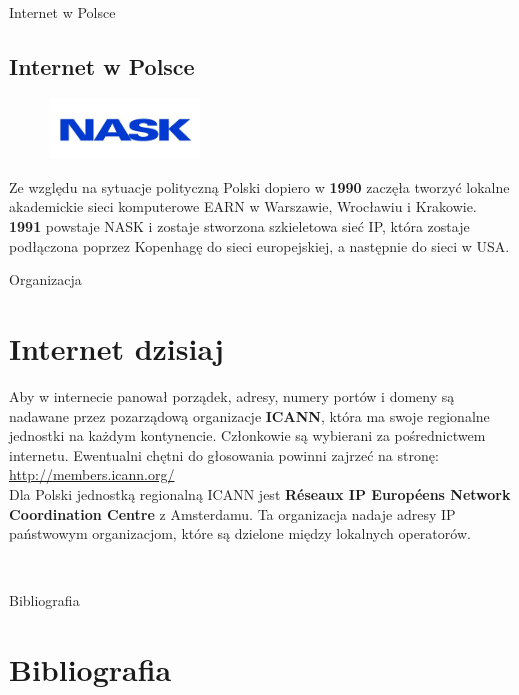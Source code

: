 \documentclass{beamer}
\begin{document}
	\begin{frame}{Internet w Polsce}
		\subsection{Internet w Polsce}
		\begin{figure}
			\flushleft
			\vspace{40pt}
			\includegraphics[width=4cm]{NASK.png}
		\end{figure}
		Ze względu na sytuacje polityczną Polski dopiero w \textbf{1990} zaczęła tworzyć lokalne akademickie sieci komputerowe EARN w Warszawie, Wrocławiu i Krakowie. \textbf{1991} powstaje NASK i zostaje stworzona szkieletowa sieć IP, która zostaje podłączona poprzez Kopenhagę do sieci europejskiej, a następnie do sieci w USA.
	\end{frame}
	\begin{frame}{Organizacja}
		\section{Internet dzisiaj}
		Aby w internecie panował porządek, adresy, numery portów i domeny są nadawane przez pozarządową organizacje \textbf{ICANN}, która ma swoje regionalne jednostki na każdym kontynencie. Członkowie są wybierani za pośrednictwem internetu. Ewentualni chętni do głosowania powinni zajrzeć na stronę: \url{http://members.icann.org/} \\ Dla Polski jednostką regionalną ICANN jest \textbf{Réseaux IP Européens Network Coordination Centre} z Amsterdamu. Ta organizacja nadaje adresy IP państwowym organizacjom, które są dzielone między lokalnych operatorów.
	\end{frame}
	\

	\begin{frame}{Bibliografia}
	\section{Bibliografia}
	
	\end{frame}
\end{document}

